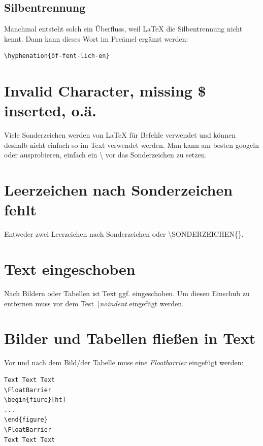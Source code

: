 \documentclass[12pt]{article}
\begin{document}
\subsection{Silbentrennung}
Manchmal entsteht solch ein Überfluss, weil LaTeX die Silbentrennung nicht kennt. Dann kann dieses Wort im Preämel ergänzt werden:
\begin{verbatim}
\hyphenation{öf-fent-lich-en}
\end{verbatim}

\section{Invalid Character, missing \$ inserted, o.ä.}
Viele Sonderzeichen werden von LaTeX für Befehle verwendet und können deshalb nicht einfach so im Text verwendet werden. Man kann am besten googeln oder ausprobieren, einfach ein \textbackslash{} vor das Sonderzeichen zu setzen.

\section{Leerzeichen nach Sonderzeichen fehlt}
Entweder zwei Leerzeichen nach Sonderzeichen oder \textbackslash SONDERZEICHEN\{\}.

\section{Text eingeschoben}
Nach Bildern oder Tabellen ist Text ggf. eingeschoben. Um diesen Einschub zu entfernen muss vor dem Test \textit{\textbackslash noindent} eingefügt werden.

\section{Bilder und Tabellen fließen in Text}
Vor und nach dem Bild/der Tabelle muss eine \textit{Floatbarrier} eingefügt werden:
\begin{verbatim}
Text Text Text
\FloatBarrier
\begin{fiure}[ht]
...
\end{figure}
\FloatBarrier
Text Text Text
\end{verbatim}


\clearpage
\frontmatter%
\renewcommand{\plaintitle}{Literaturverzeichnis}
\setcounter{page}{5}
\printMyBibliography
\clearpage
\renewcommand{\plaintitle}{Anhang}
{\def\makebox[#1][#2]#3{#3}%
    \listofanhang
}
\end{document}
